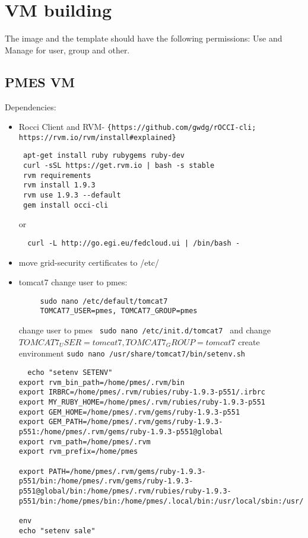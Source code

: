 \documentclass[a4paper,10pt]{article}
\begin{document}
\section{VM building}
The image and the template should have the following permissions: Use and Manage for user, group and other.
\subsection{PMES VM}
Dependencies:
\begin{itemize}

 \item Rocci Client and RVM- \verb|{https://github.com/gwdg/rOCCI-cli; https://rvm.io/rvm/install#explained}|
 \begin{lstlisting}
 apt-get install ruby rubygems ruby-dev
 curl -sSL https://get.rvm.io | bash -s stable
 rvm requirements
 rvm install 1.9.3
 rvm use 1.9.3 --default
 gem install occi-cli
 \end{lstlisting}
 or
 \begin{lstlisting}
  curl -L http://go.egi.eu/fedcloud.ui | /bin/bash -
 \end{lstlisting}

 \item move grid-security certificates to /etc/
 \item tomcat7
 \subitem change user to pmes:
 \begin{verbatim}
     sudo nano /etc/default/tomcat7
     TOMCAT7_USER=pmes, TOMCAT7_GROUP=pmes
 \end{verbatim}

 \subitem change user to pmes 
\texttt{ sudo nano /etc/init.d/tomcat7 } and change $TOMCAT7_USER=tomcat7, TOMCAT7_GROUP=tomcat7$
 \subitem create environment \texttt{sudo nano /usr/share/tomcat7/bin/setenv.sh}
 \begin{verbatim}
  echo "setenv SETENV"
export rvm_bin_path=/home/pmes/.rvm/bin
export IRBRC=/home/pmes/.rvm/rubies/ruby-1.9.3-p551/.irbrc
export MY_RUBY_HOME=/home/pmes/.rvm/rubies/ruby-1.9.3-p551
export GEM_HOME=/home/pmes/.rvm/gems/ruby-1.9.3-p551
export GEM_PATH=/home/pmes/.rvm/gems/ruby-1.9.3-p551:/home/pmes/.rvm/gems/ruby-1.9.3-p551@global
export rvm_path=/home/pmes/.rvm
export rvm_prefix=/home/pmes

export PATH=/home/pmes/.rvm/gems/ruby-1.9.3-p551/bin:/home/pmes/.rvm/gems/ruby-1.9.3-p551@global/bin:/home/pmes/.rvm/rubies/ruby-1.9.3-p551/bin:/home/pmes/bin:/home/pmes/.local/bin:/usr/local/sbin:/usr/local/bin:/usr/sbin:/usr/bin:/sbin:/bin:/usr/games:/usr/local/games:/snap/bin:/home/pmes/.rvm/bin

env
echo "setenv sale"

 \end{verbatim}

 
 \end{itemize}
\end{document}
